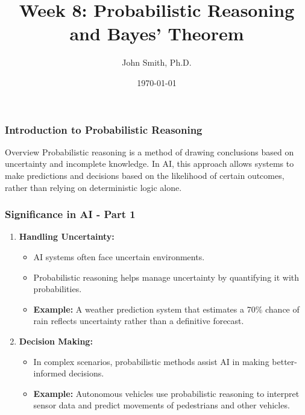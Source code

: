 \documentclass[aspectratio=169]{beamer}
\title[Week 8: Probabilistic Reasoning and Bayes' Theorem]{Week 8: Probabilistic Reasoning and Bayes' Theorem}
\author[J. Smith]{John Smith, Ph.D.}
\institute[University Name]{
  Department of Computer Science\\
  University Name\\
  \vspace{0.3cm}
  Email: email@university.edu\\
  Website: www.university.edu
}
\date{\today}
\begin{document}
\frame{\titlepage}

\begin{frame}[fragile]
    \frametitle{Introduction to Probabilistic Reasoning}
    \begin{block}{Overview}
        Probabilistic reasoning is a method of drawing conclusions based on uncertainty and incomplete knowledge. 
        In AI, this approach allows systems to make predictions and decisions based on the likelihood of certain outcomes, rather than relying on deterministic logic alone.
    \end{block}
\end{frame}

\begin{frame}[fragile]
    \frametitle{Significance in AI - Part 1}
    \begin{enumerate}
        \item \textbf{Handling Uncertainty:}
        \begin{itemize}
            \item AI systems often face uncertain environments. 
            \item Probabilistic reasoning helps manage uncertainty by quantifying it with probabilities.
            \item \textbf{Example:} A weather prediction system that estimates a 70\% chance of rain reflects uncertainty rather than a definitive forecast.
        \end{itemize}
        
        \item \textbf{Decision Making:}
        \begin{itemize}
            \item In complex scenarios, probabilistic methods assist AI in making better-informed decisions.
            \item \textbf{Example:} Autonomous vehicles use probabilistic reasoning to interpret sensor data and predict movements of pedestrians and other vehicles.
        \end{itemize}
    \end{enumerate}
\end{frame}
\end{document}
